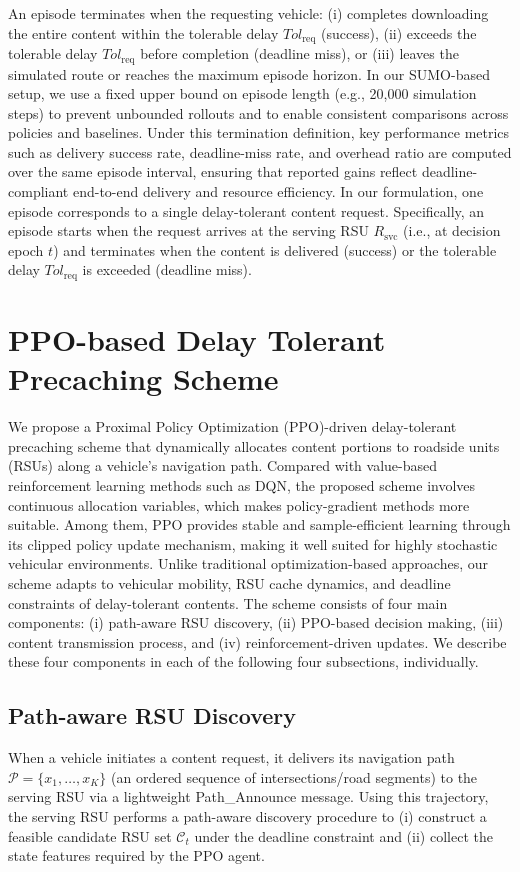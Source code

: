 An episode terminates when the requesting vehicle: (i) completes downloading the entire content within the tolerable delay $Tol_{\mathrm{req}}$ (success), (ii) exceeds the tolerable delay $Tol_{\mathrm{req}}$ before completion (deadline miss), or (iii) leaves the simulated route or reaches the maximum episode horizon. In our SUMO-based setup, we use a fixed upper bound on episode length (e.g., 20{,}000 simulation steps) to prevent unbounded rollouts and to enable consistent comparisons across policies and baselines. Under this termination definition, key performance metrics such as delivery success rate, deadline-miss rate, and overhead ratio are computed over the same episode interval, ensuring that reported gains reflect deadline-compliant end-to-end delivery and resource efficiency. In our formulation, one episode corresponds to a single delay-tolerant content request. 
Specifically, an episode starts when the request arrives at the serving RSU $R_{\mathrm{svc}}$ (i.e., at decision epoch $t$) and terminates when the content is delivered (success) or the tolerable delay $Tol_{\mathrm{req}}$ is exceeded (deadline miss).



\section{PPO-based Delay Tolerant Precaching Scheme}
\label{sec:proposed_scheme}

We propose a Proximal Policy Optimization (PPO)-driven delay-tolerant precaching scheme that dynamically allocates content portions to roadside units (RSUs) along a vehicle's navigation path. 
Compared with value-based reinforcement learning methods such as DQN, 
the proposed scheme involves continuous allocation variables, 
which makes policy-gradient methods more suitable. 
Among them, PPO provides stable and sample-efficient learning through 
its clipped policy update mechanism, making it well suited for highly 
stochastic vehicular environments.
Unlike traditional optimization-based approaches, our scheme adapts to vehicular mobility, RSU cache dynamics, and deadline constraints of delay-tolerant contents. The scheme consists of four main components: (i) path-aware RSU discovery, (ii) PPO-based decision making, (iii) content transmission process, and (iv) reinforcement-driven updates. We describe these four components in each of the following four subsections, individually.

\subsection{Path-aware RSU Discovery}
When a vehicle initiates a content request, it delivers its navigation path $\mathcal{P}=\{x_1,\ldots,x_K\}$ (an ordered sequence of intersections/road segments) to the serving RSU via a lightweight \textsf{Path\_Announce} message. 
Using this trajectory, the serving RSU performs a path-aware discovery procedure to (i) construct a feasible candidate RSU set $\mathcal{C}_t$ under the deadline constraint and (ii) collect the state features required by the PPO agent.

